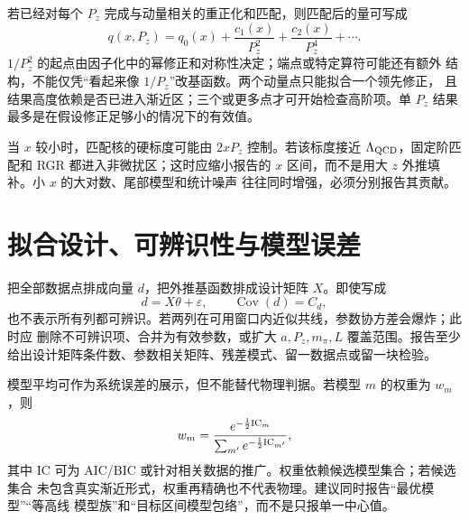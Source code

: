 若已经对每个 \(P_z\) 完成与动量相关的重正化和匹配，则匹配后的量可写成
\begin{equation}
  q(x,P_z)=q_0(x)+\frac{c_1(x)}{P_z^2}
  +\frac{c_2(x)}{P_z^4}+\cdots .
  \label{eq:b03-pz-expansion}
\end{equation}
\(1/P_z^2\) 的起点由因子化中的幂修正和对称性决定；端点或特定算符可能还有额外
结构，不能仅凭“看起来像 \(1/P_z\)”改基函数。两个动量点只能拟合一个领先修正，
且结果高度依赖是否已进入渐近区；三个或更多点才可开始检查高阶项。单 \(P_z\)
结果最多是在假设修正足够小的情况下的有效值。

当 \(x\) 较小时，匹配核的硬标度可能由 \(2xP_z\) 控制。若该标度接近
\(\Lambda_{\rm QCD}\)，固定阶匹配和 RGR 都进入非微扰区；这时应缩小报告的
\(x\) 区间，而不是用大 \(z\) 外推填补。小 \(x\) 的大对数、尾部模型和统计噪声
往往同时增强，必须分别报告其贡献。

\section{拟合设计、可辨识性与模型误差}

把全部数据点排成向量 \(d\)，把外推基函数排成设计矩阵 \(X\)。即使写成
\begin{equation}
  d=X\theta+\varepsilon,
  \qquad
  \operatorname{Cov}(d)=C_d,
  \label{eq:b03-fit-design}
\end{equation}
也不表示所有列都可辨识。若两列在可用窗口内近似共线，参数协方差会爆炸；此时应
删除不可辨识项、合并为有效参数，或扩大 \(a,P_z,m_\pi,L\) 覆盖范围。报告至少
给出设计矩阵条件数、参数相关矩阵、残差模式、留一数据点或留一块检验。

模型平均可作为系统误差的展示，但不能替代物理判据。若模型 \(m\) 的权重为
\(w_m\)，则
\begin{equation}
  w_m=\frac{e^{-\frac12{\rm IC}_m}}
  {\sum_{m'}e^{-\frac12{\rm IC}_{m'}}},
  \label{eq:b03-model-weight}
\end{equation}
其中 IC 可为 AIC/BIC 或针对相关数据的推广。权重依赖候选模型集合；若候选集合
未包含真实渐近形式，权重再精确也不代表物理。建议同时报告“最优模型”“等高线
模型族”和“目标区间模型包络”，而不是只报单一中心值。


